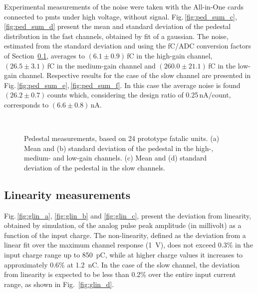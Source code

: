 Experimental measurements of the noise were taken with the All-in-One cards connected to \glspl{pmt} under high voltage, 
without signal. Fig.\,\ref{fig:ped_sum_c},\,\ref{fig:ped_sum_d} present the mean and standard deviation of the pedestal
distribution in the fast channels, obtained by fit of a gaussian. The noise, estimated from the standard deviation and 
using the fC/ADC conversion factors of Section~\ref{subsec:linearity}, averages to $(6.1\pm 0.9)$\,fC in the high-gain 
channel, $(26.5\pm 3.1)$\,fC in the medium-gain channel and $(260.0\pm 21.1)$\,fC in the low-gain channel. Respective 
results for the case of the slow channel are presented in Fig.\,\ref{fig:ped_sum_e},\,\ref{fig:ped_sum_f}. In this case 
the average noise is found $(26.2\pm 0.7)$\,counts which, considering the design ratio of 0.25\,nA/count, corresponds to 
$(6.6\pm 0.8)$\,nA.

\begin{figure}[!t]
  \centering
  \\
  \caption{Pedestal measurements, based on 24 prototype \gls{fatalic} units. (a) Mean and (b) standard deviation 
           of the pedestal in the high-, medium- and low-gain channels. (c) Mean and (d) standard 
           deviation of the pedestal in the slow channels.\label{fig:ped_sum}}
\end{figure}

\subsection{Linearity measurements}
\label{subsec:linearity}

Fig.\,\ref{fig:glin_a}, \ref{fig:glin_b} and \ref{fig:glin_c}, present the deviation from linearity, obtained by
simulation, of the analog pulse peak amplitude (in millivolt) as a function of the input charge. The non-linearity, 
defined as the deviation from a linear fit over the maximum channel response (\SI{1}{V}), does not exceed 0.3\% in 
the input charge range up to \SI{850}{pC}, while at higher charge values it increases to approximately 0.6\% at 
\SI{1.2}{nC}. In the case of the slow channel, the deviation from linearity is expected to be less than 0.2\% over 
the entire input current range, as shown in Fig.~\ref{fig:glin_d}.

